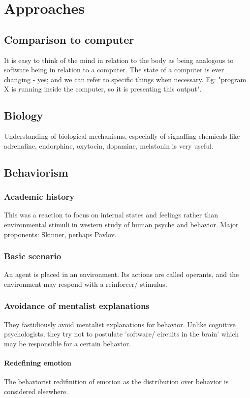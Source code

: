 \documentclass[oneside, article]{memoir}
\begin{document}
\chapter{Approaches}
\section{Comparison to computer}
It is easy to think of the mind in relation to the body as being analogous to software being in relation to a computer. The state of a computer is ever changing - yes; and we can refer to specific things when necessary. Eg: "program X is running inside the computer, so it is presenting this output".

\section{Biology}
Understanding of biological mechanisms, especially of signalling chemicals like adrenaline, endorphine, oxytocin, dopamine, melatonin is very useful.

\section{Behaviorism}
\subsection{Academic history}
This was a reaction to focus on internal states and feelings rather than environmental stimuli in western study of human psyche and behavior. Major proponents: Skinner, perhaps Pavlov.

\subsection{Basic scenario}
An agent is placed in an environment. Its actions are called operants, and the environment may respond with a reinforcer/ stimulus.

\subsection{Avoidance of mentalist explanations}
They fastidiously avoid mentalist explanations for behavior. Unlike cognitive psychologists, they try not to postulate 'software/ circuits in the brain' which may be responsible for a certain behavior.

\subsubsection{Redefining emotion}
The behaviorist redifinition of emotion as the distribution over behavior is considered elsewhere.
\end{document}
